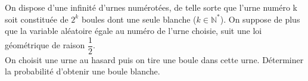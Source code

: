 \documentclass[a4paper,11pt]{article}
\begin{document}
On dispose d'une infinit\'e d'urnes num\'erot\'ees, de telle sorte que l'urne num\'ero k soit constitu\'ee de $2^k$ boules dont une seule blanche ($k \in \mathbb{N}^*$). On suppose de plus que la variable al\'eatoire
\'egale au num\'ero de l'urne choisie, suit une loi g\'eom\'etrique de raison $\dfrac{1}{2}$.\smallskip\\
On choisit une urne au hasard puis on tire une boule dans cette urne. D\'eterminer la probabilit\'e d'obtenir une boule blanche.
\end{document}
